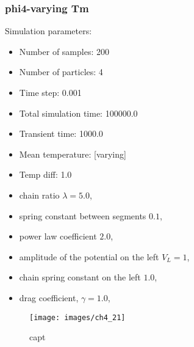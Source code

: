 \subsubsection{phi4-varying Tm}
Simulation parameters:
\begin{itemize}
	\item Number of samples: 200
	\item Number of particles: 4
	\item Time step: 0.001
	\item Total simulation time: 100000.0
	\item Transient time: 1000.0
	\item Mean temperature: [varying]
	\item Temp diff: 1.0
	\item chain ratio $ \lambda=5.0 $,
	\item spring constant between segments $ 0.1 $,
	\item power law coefficient $ 2.0 $,
	\item amplitude of the potential on the left $ V_{L}=1 $,
	\item chain spring constant on the left $ 1.0 $,
	\item drag coefficient, $ \gamma=1.0 $,
\end{itemize}

\begin{figure}[htpb]
	\centering
	\texttt{[image: images/ch4\_21]}
	\caption{capt}
	\label{fig:ch4_21}
\end{figure}
